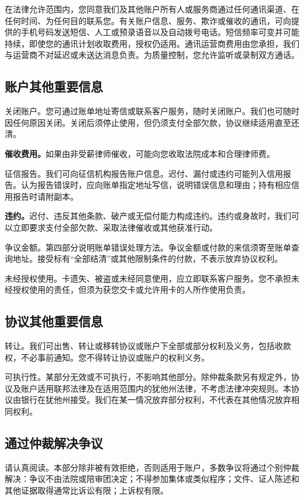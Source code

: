 \documentclass[UTF8,fontset=none,11pt,a4paper]{ctexart}
\begin{document}
在法律允许范围内，您同意我们及其他账户所有人或服务商通过任何通讯渠道、在任何时间、为任何目的联系您。有关账户信息、服务、欺诈或催收的通讯，可向提供的手机号码发送短信、人工或预录语音以及自动拨号电话。短信频率可变并可能持续，即使您的通讯计划收取费用，授权仍适用。通讯运营商费用由您承担，我们与运营商不对延迟或未送达消息负责。为质量控制，您允许监听或录制\allowbreak\mbox{双方通话。}


\subsection*{账户其他重要信息}
关闭账户。您可通过账单地址寄信或联系客户服务，随时关闭账户。我们也可随时因任何原因关闭。关闭后须停止使用，但仍须支付全部欠款，协议继续适用\allowbreak\mbox{直至还清。}


\textbf{催收费用。}如果由非受薪律师催收，可能向您收取法院成本和合\allowbreak\mbox{理律师费。}


征信报告。我们可向征信机构报告账户信息。迟付、漏付或违约可能列入信用报告。认为报告错误时，应向账单指定地址写信，说明错误信息和理由；持有相应信用报告时\allowbreak\mbox{请附副本。}


\textbf{违约。}迟付、违反其他条款、破产或无偿付能力构成违约。违约或身故时，我们可以立即要求支付全部欠款、采取法律催收或其他\allowbreak\mbox{获准行动。}


争议金额。第四部分说明账单错误处理方法。争议金额或付款的来信须寄至账单查询地址。接受标有“全部结清”或其他限制条件的付款，不表示放弃\allowbreak\mbox{协议权利。}


未经授权使用。卡遗失、被盗或未经同意使用，应立即联系客户服务。您不承担未经授权使用的责任，但须为获您交卡或允许用卡的人所作\allowbreak\mbox{使用负责。}


\subsection*{协议其他重要信息}
转让。我们可出售、转让或移转协议或账户下全部或部分权利及义务，包括收款权，不必事前通知。您不得转让协议或账户的\allowbreak\mbox{权利义务。}


可执行性。某部分无效或不可执行，不影响其他部分。除仲裁条款另有规定外，协议及账户适用联邦法律及在适用范围内的犹他州法律，不考虑法律冲突规则。本协议由银行在犹他州接受。我们在某一情况放弃部分权利，不代表在其他情况放弃\allowbreak\mbox{相同权利。}


\subsection*{通过仲裁解决争议}
请认真阅读。本部分除非被有效拒绝，否则适用于账户，多数争议将通过个别仲裁解决：争议不由法院或陪审团决定；不得参加集体或类似程序；文件、证人陈述和其他证据取得通常比诉讼有限；上\allowbreak\mbox{诉权有限。}
\end{document}
